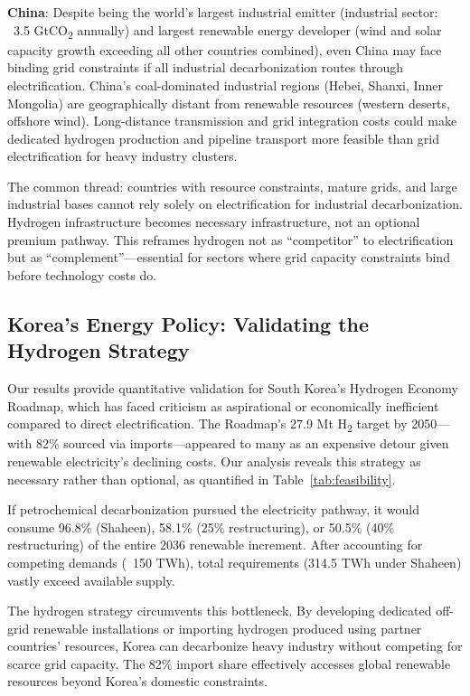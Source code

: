 \documentclass[11pt,a4paper]{article}
\begin{document}
\textbf{China}: Despite being the world's largest industrial emitter (industrial sector: ~3.5 GtCO\textsubscript{2} annually) and largest renewable energy developer (wind and solar capacity growth exceeding all other countries combined), even China may face binding grid constraints if all industrial decarbonization routes through electrification. China's coal-dominated industrial regions (Hebei, Shanxi, Inner Mongolia) are geographically distant from renewable resources (western deserts, offshore wind). Long-distance transmission and grid integration costs could make dedicated hydrogen production and pipeline transport more feasible than grid electrification for heavy industry clusters.

The common thread: countries with resource constraints, mature grids, and large industrial bases cannot rely solely on electrification for industrial decarbonization. Hydrogen infrastructure becomes necessary infrastructure, not an optional premium pathway. This reframes hydrogen not as ``competitor'' to electrification but as ``complement''---essential for sectors where grid capacity constraints bind before technology costs do.

\subsection{Korea's Energy Policy: Validating the Hydrogen Strategy}

Our results provide quantitative validation for South Korea's Hydrogen Economy Roadmap, which has faced criticism as aspirational or economically inefficient compared to direct electrification. The Roadmap's 27.9 Mt H\textsubscript{2} target by 2050---with 82\% sourced via imports---appeared to many as an expensive detour given renewable electricity's declining costs. Our analysis reveals this strategy as necessary rather than optional, as quantified in Table~\ref{tab:feasibility}.

If petrochemical decarbonization pursued the electricity pathway, it would consume 96.8\% (Shaheen), 58.1\% (25\% restructuring), or 50.5\% (40\% restructuring) of the entire 2036 renewable increment. After accounting for competing demands (~150 TWh), total requirements (314.5 TWh under Shaheen) vastly exceed available supply.

The hydrogen strategy circumvents this bottleneck. By developing dedicated off-grid renewable installations or importing hydrogen produced using partner countries' resources, Korea can decarbonize heavy industry without competing for scarce grid capacity. The 82\% import share effectively accesses global renewable resources beyond Korea's domestic constraints.
\end{document}
